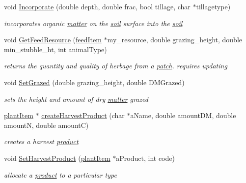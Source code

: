 \begin{DoxyCompactItemize}
void \hyperlink{classpatch_interface_class_a631b4c8068483aa35e1e84012b1d5a99}{Incorporate} (double depth, double frac, bool tillage, char $\ast$tillagetype)
\begin{DoxyCompactList}\small\item\em incorporates organic \hyperlink{classmatter}{matter} on the \hyperlink{classsoil}{soil} surface into the \hyperlink{classsoil}{soil} \item\end{DoxyCompactList}\item 
void \hyperlink{classpatch_interface_class_a7fc64cbacbd920e5dceea2cb2f4d0169}{GetFeedResource} (\hyperlink{classfeed_item}{feedItem} $\ast$my\_\-resource, double grazing\_\-height, double min\_\-stubble\_\-ht, int animalType)
\begin{DoxyCompactList}\small\item\em returns the quantity and quality of herbage from a \hyperlink{classpatch}{patch}. requires updating \item\end{DoxyCompactList}\item 
void \hyperlink{classpatch_interface_class_a1bafa05b047f34929b265ff063237ef8}{SetGrazed} (double grazing\_\-height, double DMGrazed)
\begin{DoxyCompactList}\small\item\em sets the height and amount of dry \hyperlink{classmatter}{matter} grazed \item\end{DoxyCompactList}\item 
\hyperlink{classplant_item}{plantItem} $\ast$ \hyperlink{classpatch_interface_class_a5c6deeeba41629b53acc8a1b990854db}{createHarvestProduct} (char $\ast$aName, double amountDM, double amountN, double amountC)
\begin{DoxyCompactList}\small\item\em creates a harvest \hyperlink{classproduct}{product} \item\end{DoxyCompactList}\item 
void \hyperlink{classpatch_interface_class_a6c21218372f6dcc9a1e447af1f3afe22}{SetHarvestProduct} (\hyperlink{classplant_item}{plantItem} $\ast$aProduct, int code)
\begin{DoxyCompactList}\small\item\em allocate a \hyperlink{classproduct}{product} to a particular type \item\end{DoxyCompactList}\item 

\end{DoxyCompactItemize}
